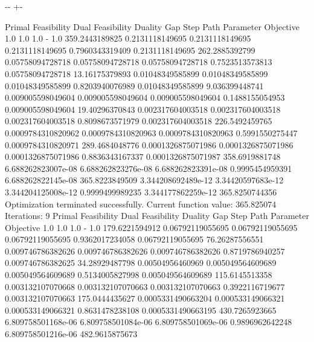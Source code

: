 \documentclass[letterpaper,10pt,english]{sphinxmanual}
\newlength\nbsphinxcodecellspacing
\begin{document}
{

\kern-\sphinxverbatimsmallskipamount\kern-\baselineskip
\kern+\FrameHeightAdjust\kern-\fboxrule
\vspace{\nbsphinxcodecellspacing}

\begin{sphinxVerbatim}[commandchars=\\\{\}]
Primal Feasibility  Dual Feasibility    Duality Gap         Step             Path Parameter      Objective
1.0                 1.0                 1.0                 -                1.0                 359.2443189825
0.2131118149695     0.2131118149695     0.2131118149695     0.7960343319409  0.2131118149695     262.2885392799
0.05758094728718    0.05758094728718    0.05758094728718    0.7523513573813  0.05758094728718    13.16175379893
0.01048349585899    0.01048349585899    0.01048349585899    0.8203940076989  0.01048349585899    9.036399448741
0.009005598049604   0.009005598049604   0.009005598049604   0.1488155054953  0.009005598049604   19.40296370843
0.002317604003518   0.002317604003518   0.002317604003518   0.8098673571979  0.002317604003518   226.5492459765
0.0009784310820962  0.0009784310820963  0.0009784310820963  0.5991550275447  0.0009784310820971  289.4684048776
0.0001326875071986  0.0001326875071986  0.0001326875071986  0.8836343167337  0.0001326875071987  358.6919881748
6.688262823007e-08  6.688262823276e-08  6.688262823391e-08  0.9995454959391  6.688262822145e-08  365.8223849509
3.344208692489e-12  3.34420597683e-12   3.344204125008e-12  0.9999499989235  3.344177862259e-12  365.8250744356
Optimization terminated successfully.
         Current function value: 365.825074
         Iterations: 9
Primal Feasibility  Dual Feasibility    Duality Gap         Step             Path Parameter      Objective
1.0                 1.0                 1.0                 -                1.0                 179.6221594912
0.06792119055695    0.06792119055695    0.06792119055695    0.9362017234058  0.06792119055695    76.26287556551
0.009746786382626   0.009746786382626   0.009746786382626   0.8719786940257  0.009746786382625   34.28929487798
0.00504956460969    0.005049564609689   0.005049564609689   0.5134005827998  0.005049564609689   115.6145513358
0.003132107070668   0.003132107070663   0.003132107070663   0.3922116719677  0.003132107070663   175.0444435627
0.0005331490663204  0.000533149066321   0.000533149066321   0.8631478238108  0.0005331490663195  430.7265923665
6.809758501168e-06  6.809758501084e-06  6.809758501069e-06  0.9896962642248  6.809758501216e-06  482.9615875673

\end{sphinxVerbatim}}
\end{document}

